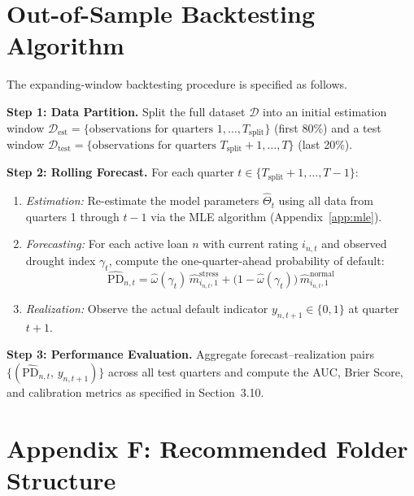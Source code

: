\documentclass[12pt,a4paper]{article}
\begin{document}
\section{Out-of-Sample Backtesting Algorithm}
\label{app:backtest}

The expanding-window backtesting procedure is specified as follows.

\textbf{Step 1: Data Partition.} Split the full dataset $\mathcal{D}$ into an initial estimation window $\mathcal{D}_{\text{est}} = \{\text{observations for quarters } 1, \ldots, T_{\text{split}}\}$ (first 80\%) and a test window $\mathcal{D}_{\text{test}} = \{\text{observations for quarters } T_{\text{split}}+1, \ldots, T\}$ (last 20\%).

\textbf{Step 2: Rolling Forecast.} For each quarter $t \in \{T_{\text{split}}+1, \ldots, T-1\}$:
\begin{enumerate}[noitemsep]
    \item \textit{Estimation:} Re-estimate the model parameters $\hat{\Theta}_t$ using all data from quarters 1 through $t-1$ via the MLE algorithm (Appendix~\ref{app:mle}).
    \item \textit{Forecasting:} For each active loan $n$ with current rating $i_{n,t}$ and observed drought index $\gamma_t$, compute the one-quarter-ahead probability of default:
    \begin{equation}
    \widehat{\text{PD}}_{n,t} = \hat{\omega}(\gamma_t)\, \hat{m}_{i_{n,t},1}^{\text{stress}} + \bigl(1 - \hat{\omega}(\gamma_t)\bigr)\, \hat{m}_{i_{n,t},1}^{\text{normal}}
    \end{equation}
    \item \textit{Realization:} Observe the actual default indicator $y_{n,t+1} \in \{0, 1\}$ at quarter $t+1$.
\end{enumerate}

\textbf{Step 3: Performance Evaluation.} Aggregate forecast--realization pairs $\{(\widehat{\text{PD}}_{n,t},\, y_{n,t+1})\}$ across all test quarters and compute the AUC, Brier Score, and calibration metrics as specified in Section~3.10.

\newpage

\section*{Appendix F: Recommended Folder Structure}\label{app:folder}
\end{document}
